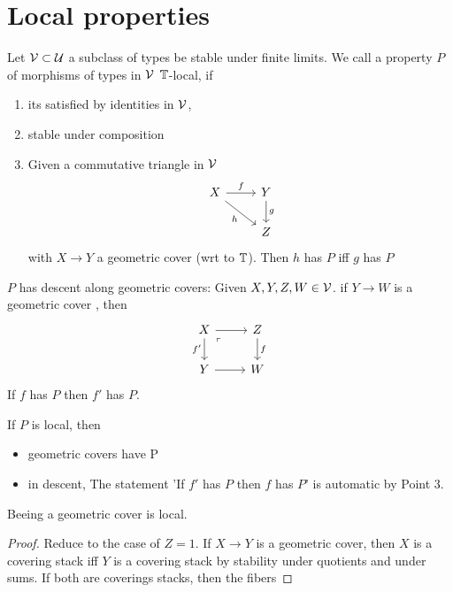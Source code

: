 \section{Local properties}

\begin{definition}
	Let $\mathcal{V} \subset \mathcal{U}$ a subclass of types be stable under finite limits. 
	We call a property $P$ of morphisms of types in $\mathcal{V}$ $\mathbb{T}$-local, if 
	\begin{enumerate}
		\item its satisfied by identities in $\mathcal{V}$,
		\item stable under composition 
		\item
		Given a commutative triangle in $\mathcal{V}$%
		\[\begin{tikzcd}
			X & Y \\
			& Z
			\arrow["f", from=1-1, to=1-2]
			\arrow["h"', from=1-1, to=2-2]
			\arrow["g", from=1-2, to=2-2]
		\end{tikzcd}\]
		with $X \to Y$ a geometric cover (wrt to $\mathbb{T}$). Then $h$ has $P$ iff $g$ has $P$
		
	
	\end{enumerate}

\end{definition}
\begin{definition}
	$P$ has descent along geometric covers: Given $X,Y,Z,W \in \mathcal{V}$. if $Y \to W$ is a geometric cover , then 
	\[\begin{tikzcd}
		X & Z \\
		Y & W
		\arrow[from=1-1, to=1-2]
		\arrow["{f'}"', from=1-1, to=2-1]
		\arrow["\ulcorner"{anchor=center, pos=0.125}, draw=none, from=1-1, to=2-2]
		\arrow["f", from=1-2, to=2-2]
		\arrow[from=2-1, to=2-2]
	\end{tikzcd}\]
	If $f$ has $P$ then $f'$ has $P$.
\end{definition}
	\begin{lemma}{\label{lemma:local}}
	If $P$ is local, then 
	\begin{itemize}
		\item geometric covers have P
		\item in descent, The statement 'If $f'$ has $P$ then $f$ has $P$' is automatic by Point 3.
	\end{itemize}
\end{lemma}
\begin{lemma}
	Beeing a geometric cover is local.
\end{lemma}
\begin{proof}
	Reduce to the case of $Z = 1$. If $X \to Y$ is a geometric cover, then $X$ is a covering stack iff $Y$ is a covering stack by stability under quotients and under sums. If both are coverings stacks, then the fibers 
\end{proof}

